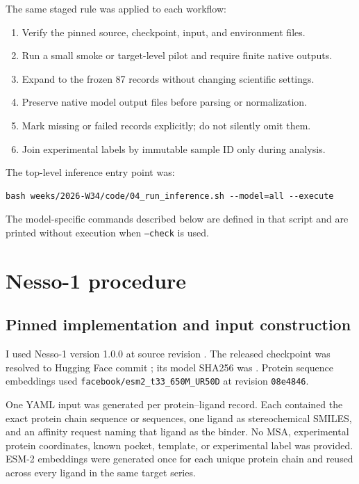 \documentclass[11pt]{article}
\begin{document}
The same staged rule was applied to each workflow:
\begin{enumerate}
  \item Verify the pinned source, checkpoint, input, and environment files.
  \item Run a small smoke or target-level pilot and require finite native
  outputs.
  \item Expand to the frozen 87 records without changing scientific settings.
  \item Preserve native model output files before parsing or normalization.
  \item Mark missing or failed records explicitly; do not silently omit them.
  \item Join experimental labels by immutable sample ID only during analysis.
\end{enumerate}

The top-level inference entry point was:
\begin{verbatim}
bash weeks/2026-W34/code/04_run_inference.sh --model=all --execute
\end{verbatim}
The model-specific commands described below are defined in that script and
are printed without execution when \texttt{--check} is used.

\section{Nesso-1 procedure}

\subsection{Pinned implementation and input construction}

I used Nesso-1 version 1.0.0 at source revision
\texttt{}. The released checkpoint was
resolved to Hugging Face commit
\texttt{}; its model SHA256 was
\texttt{}.
Protein sequence embeddings used
\texttt{facebook/esm2\_t33\_650M\_UR50D} at revision \texttt{08e4846}.

One YAML input was generated per protein--ligand record. Each contained the
exact protein chain sequence or sequences, one ligand as stereochemical SMILES,
and an affinity request naming that ligand as the binder. No MSA, experimental
protein coordinates, known pocket, template, or experimental label was
provided. ESM-2 embeddings were generated once for each unique protein chain
and reused across every ligand in the same target series.
\end{document}
